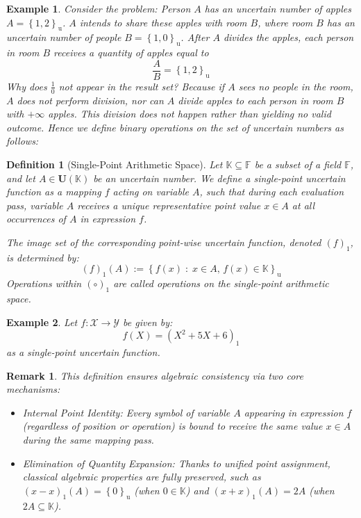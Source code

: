 \documentclass[a4paper,12pt,twoside]{memoir}
\newtheorem{definition}{Definition}[chapter]
\newtheorem{remark}{Remark}[chapter]
\newtheorem{example}{Example}[chapter]
\newcommand{\set}[1]{\left\{#1\right\}} %
\newcommand{\s}[1]{\set{#1}_\mathrm{u}} %
\newcommand{\tsbd}[1]{\mathbf{U}(\mathbb{#1})}
\newcommand{\kgdd}[1]{\left(#1\right)_1} %
\begin{document}
	\begin{example}
		Consider the problem: Person $A$ has an uncertain number of apples $A=\s{1,2}$. $A$ intends to share these apples with room $B$, where room $B$ has an uncertain number of people $B = \s{1,0}$. After $A$ divides the apples, each person in room $B$ receives a quantity of apples equal to
		\[\frac{A}{B} = \s{1,2}\]
		Why does $\frac{1}{0}$ not appear in the result set? Because if $A$ sees no people in the room, $A$ does not perform division, nor can $A$ divide apples to each person in room $B$ with $+\infty$ apples. This division does not happen rather than yielding no valid outcome. Hence we define binary operations on the set of uncertain numbers as follows:
	\end{example}
	
	\begin{definition}[Single-Point Arithmetic Space]
		Let $\mathbb{K} \subseteq \mathbb{F}$ be a subset of a field $\mathbb{F}$, and let $A \in \tsbd{K}$ be an uncertain number. We define a single-point uncertain function as a mapping $f$ acting on variable $A$, such that during each evaluation pass, variable $A$ receives a unique representative point value $x \in A$ at all occurrences of $A$ in expression $f$.
		
		The image set of the corresponding point-wise uncertain function, denoted $\kgdd{f}$, is determined by:
		\[
		\kgdd{f}(A) := \s{f(x) \;:\; x \in A, \, f(x) \in \mathbb{K}}
		\]
		Operations within $(\circ)_1$ are called operations on the single-point arithmetic space.
	\end{definition}
	
	\begin{example}
		Let $f : \mathcal{X} \to \mathcal{Y}$ be given by:
		\[f(X) = (X^2+5X+6)_1\] as a single-point uncertain function.
	\end{example}
	
	\begin{remark}
		This definition ensures algebraic consistency via two core mechanisms:
		\begin{itemize}[leftmargin=*]
			\item Internal Point Identity: Every symbol of variable $A$ appearing in expression $f$ (regardless of position or operation) is bound to receive the same value $x \in A$ during the same mapping pass.
			\item Elimination of Quantity Expansion: Thanks to unified point assignment, classical algebraic properties are fully preserved, such as $\kgdd{x - x}(A) = \s{0}$ (when $0 \in \mathbb{K}$) and $\kgdd{x + x}(A) = 2A$ (when $2A \subseteq \mathbb{K}$).
		\end{itemize}
	\end{remark}
	
\end{document}
